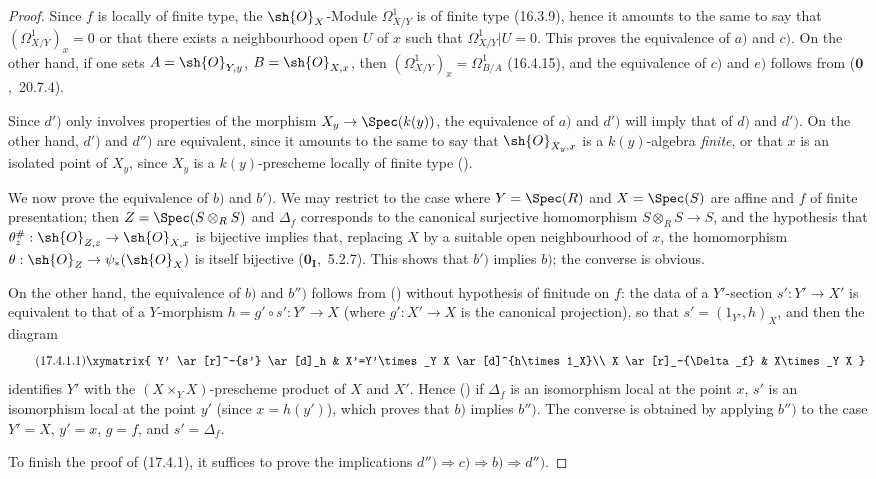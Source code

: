 \begin{proof}
Since $f$ is locally of finite type, the $\sh{O}_X$-Module $\Omega^1_{X/Y}$ is of finite type (16.3.9), hence it amounts to the same to say that $(\Omega^1_{X/Y})_x=0$ or that there exists a neighbourhood open $U$ of $x$ such that $\Omega^1_{X/Y}|U=0$.
This proves the equivalence of $a)$ and $c)$.
On the other hand, if one sets $A=\sh{O}_{Y,y}$, $B=\sh{O}_{X,x}$, then $(\Omega^1_{X/Y})_x=\Omega^1_{B/A}$ (16.4.15), and the equivalence of $c)$ and $e)$ follows from ($\mathbf{0}$,~20.7.4).

Since $d')$ only involves properties of the morphism $X_y\to\Spec(k(y))$, the equivalence of $a)$ and $d')$ will imply that of $d)$ and $d')$.
On the other hand, $d')$ and $d'')$ are equivalent, since it amounts to the same to say that $\sh{O}_{X_y,x}$ is a $k(y)$-algebra \emph{finite}, or that $x$ is an isolated point of $X_y$, since $X_y$ is a $k(y)$-prescheme locally of finite type ().

We now prove the equivalence of $b)$ and $b')$.
We may restrict to the case where $Y=\Spec(R)$ and $X=\Spec(S)$ are affine and $f$ of finite presentation; then $Z=\Spec(S\otimes_R S)$ and $\Delta_f$ corresponds to the canonical surjective homomorphism $S\otimes_R S\to S$, and the hypothesis that $\theta_z^\#:\sh{O}_{Z,z}\to\sh{O}_{X,x}$ is bijective implies that, replacing $X$ by a suitable open neighbourhood of $x$, the homomorphism $\theta:\sh{O}_Z\to\psi_*(\sh{O}_X)$ is itself bijective ($\mathbf{0}_\mathbf{I}$,~5.2.7).
This shows that $b')$ implies $b)$; the converse is obvious.

On the other hand, the equivalence of $b)$ and $b'')$ follows from () without hypothesis of finitude on $f$: the data of a $Y'$-section $s':Y'\to X'$ is equivalent to that of a $Y$-morphism $h=g'\circ s':Y'\to X$ (where $g':X'\to X$ is the canonical projection), so that $s'=(1_{Y'},h)_X$, and then the diagram
\[
\tag{17.4.1.1}
\xymatrix{
Y' \ar[r]^-{s'} \ar[d]_h & X'=Y'\times_Y X \ar[d]^{h\times 1_X}\\
X \ar[r]_-{\Delta_f} & X\times_Y X
}
\]
identifies $Y'$ with the $(X\times_Y X)$-prescheme product of $X$ and $X'$.
Hence () if $\Delta_f$ is an isomorphism local at the point $x$, $s'$ is an isomorphism local at the point $y'$ (since $x=h(y')$), which proves that $b)$ implies $b'')$.
The converse is obtained by applying $b'')$ to the case $Y'=X$, $y'=x$, $g=f$, and $s'=\Delta_f$.

To finish the proof of (17.4.1), it suffices to prove the implications $d'')\Rightarrow c)\Rightarrow b)\Rightarrow d'')$.


\end{proof}
